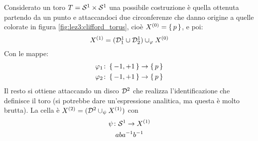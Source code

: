 \begin{example}[Toro]
  Considerato un toro $ T = \mathcal{S}^{1} \times \mathcal{S}^{1} $ una possibile costruzione
  è quella ottenuta partendo da un punto e attaccandoci due circonferenze
  che danno origine a quelle colorate in figura \ref{fig:lez3:clifford_torus},
  cioè $ X^{(0)} = \set{p} $, e poi:
  \[
    X^{(1)} = (\mathcal{D}^{1}_1 \cup \mathcal{D}^{1}_2) \cup_\varphi X^{(0)}
  \]
  Con le mappe:
  \begin{gather*}
    \varphi_1 \colon \set{-1, +1} \to \set{p} \\
    \varphi_2 \colon \set{-1, +1} \to \set{p}
  \end{gather*}
  Il resto si ottiene attaccando un disco $ \mathcal{D}^{2} $ che realizza
  l'identificazione che definisce il toro (si potrebbe dare un'espressione
  analitica, ma questa è molto brutta). La cella è
  $ X^{(2)} = (\mathcal{D}^{2} \cup_\psi X^{(1)}) $ con
  \begin{gather*}
    \psi \colon \mathcal{S}^{1}  \to X^{(1)} \\
    aba^{-1}b^{-1}
  \end{gather*}
\end{example}

